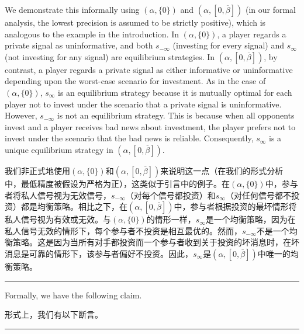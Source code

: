 \documentclass[12pt,a4paper]{article}
\newenvironment{original}
  {\par\medskip\noindent\color{black}\ignorespaces}
  {\par\medskip}
\newenvironment{translation}
  {\par\noindent\color{darkblue}\ignorespaces}
  {\par\medskip\noindent\hrule\par\medskip}
\theoremstyle{definition}
\theoremstyle{remark}
\begin{document}
\begin{original}
We demonstrate this informally using $(\alpha, \{0\})$ and $(\alpha, [0, \overline{\beta}])$ (in our formal analysis, the lowest precision is assumed to be strictly positive), which is analogous to the example in the introduction. In $(\alpha, \{0\})$, a player regards a private signal as uninformative, and both $s_{-\infty}$ (investing for every signal) and $s_{\infty}$ (not investing for any signal) are equilibrium strategies. In $(\alpha, [0, \overline{\beta}])$, by contrast, a player regards a private signal as either informative or uninformative depending upon the worst-case scenario for investment. As in the case of $(\alpha, \{0\})$, $s_{\infty}$ is an equilibrium strategy because it is mutually optimal for each player not to invest under the scenario that a private signal is uninformative. However, $s_{-\infty}$ is not an equilibrium strategy. This is because when all opponents invest and a player receives bad news about investment, the player prefers not to invest under the scenario that the bad news is reliable. Consequently, $s_{\infty}$ is a unique equilibrium strategy in $(\alpha, [0, \overline{\beta}])$.
\end{original}
\begin{translation}
我们非正式地使用$(\alpha, \{0\})$和$(\alpha, [0, \overline{\beta}])$来说明这一点（在我们的形式分析中，最低精度被假设为严格为正），这类似于引言中的例子。在$(\alpha, \{0\})$中，参与者将私人信号视为无效信号，$s_{-\infty}$（对每个信号都投资）和$s_{\infty}$（对任何信号都不投资）都是均衡策略。相比之下，在$(\alpha, [0, \overline{\beta}])$中，参与者根据投资的最坏情形将私人信号视为有效或无效。与$(\alpha, \{0\})$的情形一样，$s_{\infty}$是一个均衡策略，因为在私人信号无效的情形下，每个参与者不投资是相互最优的。然而，$s_{-\infty}$不是一个均衡策略。这是因为当所有对手都投资而一个参与者收到关于投资的坏消息时，在坏消息是可靠的情形下，该参与者偏好不投资。因此，$s_{\infty}$是$(\alpha, [0, \overline{\beta}])$中唯一的均衡策略。
\end{translation}

\begin{original}
Formally, we have the following claim.
\end{original}
\begin{translation}
形式上，我们有以下断言。
\end{translation}
\end{document}
